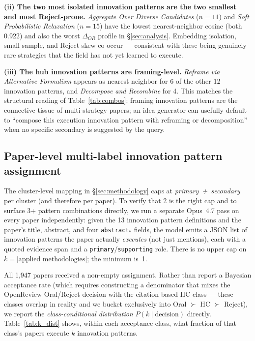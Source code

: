 \documentclass[10pt,a4paper]{article}
\begin{document}
\textbf{(ii) The two most isolated innovation patterns are the two smallest and most Reject-prone.} \emph{Aggregate Over Diverse Candidates} ($n{=}11$) and \emph{Soft Probabilistic Relaxation} ($n{=}15$) have the lowest nearest-neighbor cosine (both 0.922) and also the worst $\Delta_{OR}$ profile in \S\ref{sec:analysis}. Embedding isolation, small sample, and Reject-skew co-occur --- consistent with these being genuinely rare strategies that the field has not yet learned to execute.

\textbf{(iii) The hub innovation patterns are framing-level.} \emph{Reframe via Alternative Formalism} appears as nearest neighbor for 6 of the other 12 innovation patterns, and \emph{Decompose and Recombine} for 4. This matches the structural reading of Table~\ref{tab:combos}: framing innovation patterns are the connective tissue of multi-strategy papers; an idea generator can usefully default to ``compose this execution innovation pattern with reframing or decomposition'' when no specific secondary is suggested by the query.

\subsection{Paper-level multi-label innovation pattern assignment}
\label{subsec:multilabel}

The cluster-level mapping in \S\ref{sec:methodology} caps at \emph{primary~+~secondary} per cluster (and therefore per paper). To verify that 2 is the right cap and to surface 3+ pattern combinations directly, we run a separate Opus~4.7 pass on every paper independently: given the 13 innovation pattern definitions and the paper's title, abstract, and four \texttt{abstract}$_*$ fields, the model emits a JSON list of innovation patterns the paper actually \emph{executes} (not just mentions), each with a quoted evidence span and a \texttt{primary}/\texttt{supporting} role. There is no upper cap on \(k = |\text{applied\_methodologies}|\); the minimum is~1.

All 1{,}947 papers received a non-empty assignment. Rather than report a Bayesian acceptance rate (which requires constructing a denominator that mixes the OpenReview Oral/Reject decision with the citation-based HC class — these classes overlap in reality and we bucket exclusively into Oral $\succ$ HC $\succ$ Reject), we report the \emph{class-conditional distribution} \(P(k \mid \text{decision})\) directly. Table~\ref{tab:k_dist} shows, within each acceptance class, what fraction of that class's papers execute \(k\) innovation patterns.
\end{document}

